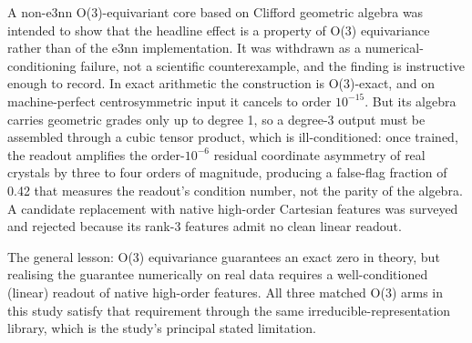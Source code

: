 A non-e3nn O(3)-equivariant core based on Clifford geometric algebra\cite{polat2026cliffordstf} was intended to show that the headline effect is a property of O(3) equivariance rather than of the e3nn implementation. It was withdrawn as a numerical-conditioning failure, not a scientific counterexample, and the finding is instructive enough to record. In exact arithmetic the construction is O(3)-exact, and on machine-perfect centrosymmetric input it cancels to order $10^{-15}$. But its algebra carries geometric grades only up to degree 1, so a degree-3 output must be assembled through a cubic tensor product, which is ill-conditioned: once trained, the readout amplifies the order-$10^{-6}$ residual coordinate asymmetry of real crystals by three to four orders of magnitude, producing a false-flag fraction of 0.42 that measures the readout's condition number, not the parity of the algebra. A candidate replacement with native high-order Cartesian features was surveyed and rejected because its rank-3 features admit no clean linear readout.

The general lesson: O(3) equivariance guarantees an exact zero in theory, but realising the guarantee numerically on real data requires a well-conditioned (linear) readout of native high-order features. All three matched O(3) arms in this study satisfy that requirement through the same irreducible-representation library, which is the study's principal stated limitation.

